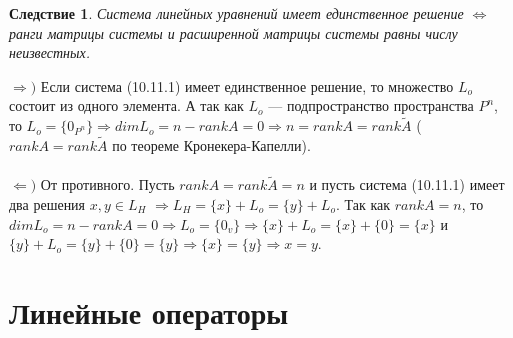 \newtheorem*{cor10_11}{Следствие}\begin{cor10_11}Система линейных уравнений имеет единственное решение $\Longleftrightarrow$ ранги матрицы системы и расширенной матрицы системы равны числу неизвестных.
\end{cor10_11}\begin{Proof}
	$\Rightarrow)$ Если система (10.11.1) имеет единственное решение, то множество $L_o$ состоит из одного элемента. А так как $L_o$ --- подпространство пространства $P^n$, то $L_o = \{0_{P^n}\} \Rightarrow dimL_o = n-rankA = 0\Rightarrow n= rankA = rank \widetilde{A}$ ($rankA = rank\widetilde{A}$ по теореме Кронекера-Капелли).\\\\
	$\Leftarrow )$ От противного. Пусть $rankA = rank\widetilde{A} = n$ и пусть система (10.11.1) имеет два решения $x,y \in L_H$ $\Rightarrow L_H = \{ x\} + L_o = \{ y\} + L_o$.
	Так как $rankA = n$, то $dim L_o = n-rankA = 0\Rightarrow L_o =\{ 0_v \}\Rightarrow \{x\} + L_o = \{x\} + \{0\} = \{x\}$ и $\{y\} + L_o = \{y\} + \{0\} = \{y\}\Rightarrow \{x\} = \{y\} \Rightarrow x = y$.
\end{Proof}	





\chapter{Линейные операторы}
